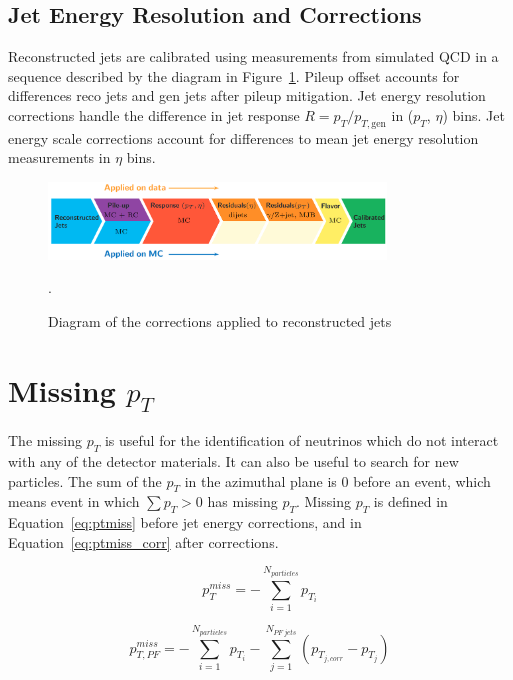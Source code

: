 \subsection*{Jet Energy Resolution and Corrections}


Reconstructed jets are calibrated using measurements from simulated QCD
 in a sequence described by the diagram in Figure~\ref{fig:jerc}. Pileup offset accounts for differences reco jets and gen jets after pileup mitigation. Jet energy resolution corrections handle the difference in jet response $R = p_{T} / p_{T,\text{gen}}$ in ($p_T$, $\eta$) bins. Jet energy scale corrections account for differences to mean jet energy resolution measurements in $\eta$ bins.

\begin{figure}[h]
\centering
	\includegraphics[width=0.8\textwidth]{figures/jerc.png}
	\caption{Diagram of the corrections applied to reconstructed jets~\cite{JEC2012}}.
	\label{fig:jerc}
\end{figure}


\section{Missing $p_T$}

The missing $p_T$ is useful for the identification of neutrinos which do not interact with any of the detector materials. It can also be useful to search for new particles. The sum of the $p_T$ in the azimuthal plane is 0 before an event, which means event in which $\sum p_{T} > 0$ has missing $p_T$. Missing $p_T$ is defined in Equation~\ref{eq:ptmiss} before jet energy corrections, and in Equation~\ref{eq:ptmiss_corr} after corrections.

\begin{equation}
	p^{miss}_{T}   = -\sum_{i=1}^{N_{particles}} p_{T_{i}}
	\label{eq:ptmiss}
\end{equation}

\begin{equation}
	p^{miss}_{T,PF}   = -\sum_{i=1}^{N_{particles}} p_{T_{i}} - \sum_{j=1}^{N_{PF\ jets}} (p_{T_{j,corr}} - p_{T_{j}})
	\label{eq:ptmiss_corr}
\end{equation}

